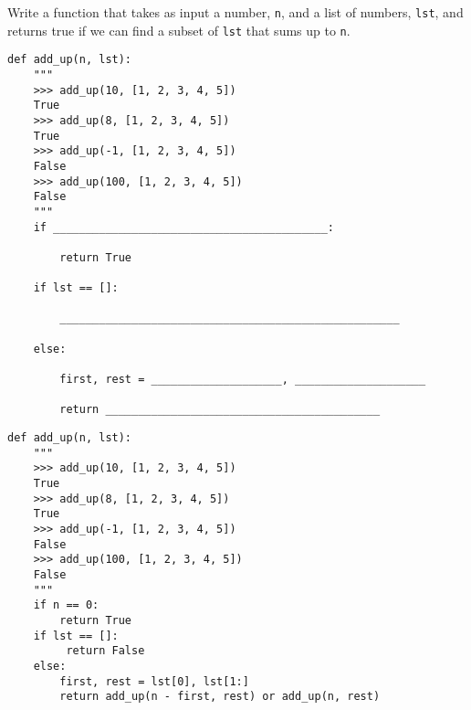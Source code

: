 \begin{blocksection}
\question Write a function that takes as input a number, \texttt{n}, and a list of numbers, \texttt{lst}, and returns true if we can find a subset of \texttt{lst} that sums up to \texttt{n}.

\ifprintanswers\else
\begin{lstlisting}
def add_up(n, lst):
    """ 
    >>> add_up(10, [1, 2, 3, 4, 5])
    True
    >>> add_up(8, [1, 2, 3, 4, 5])
    True
    >>> add_up(-1, [1, 2, 3, 4, 5])
    False
    >>> add_up(100, [1, 2, 3, 4, 5])
    False
    """
    if __________________________________________:
    
        return True
        
    if lst == []:
    
        ____________________________________________________
        
    else:
    
        first, rest = ____________________, ____________________
        
        return __________________________________________
\end{lstlisting}
\fi

\begin{solution}
\begin{lstlisting}
def add_up(n, lst):
    """ 
    >>> add_up(10, [1, 2, 3, 4, 5])
    True
    >>> add_up(8, [1, 2, 3, 4, 5])
    True
    >>> add_up(-1, [1, 2, 3, 4, 5])
    False
    >>> add_up(100, [1, 2, 3, 4, 5])
    False
    """
    if n == 0:
        return True
    if lst == []:
         return False  
    else:
        first, rest = lst[0], lst[1:]
        return add_up(n - first, rest) or add_up(n, rest)

\end{lstlisting}
\end{solution}
\end{blocksection}
